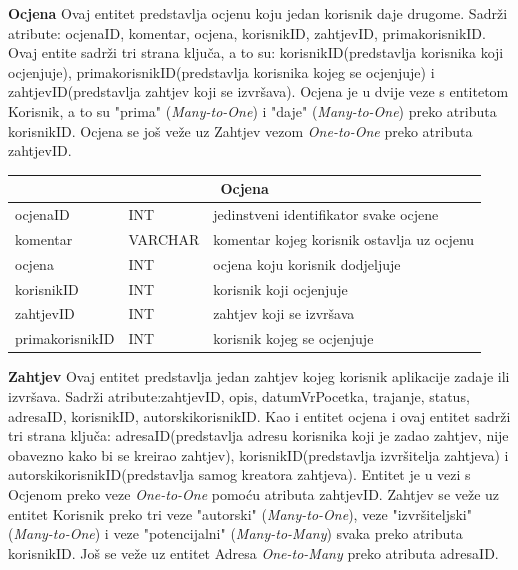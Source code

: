 			\bigskip
			\bigskip
			\textbf{Ocjena} Ovaj entitet predstavlja ocjenu koju jedan korisnik daje drugome. Sadrži atribute: ocjenaID, komentar, ocjena, korisnikID, zahtjevID, primakorisnikID. Ovaj entite sadrži tri strana ključa, a to su: korisnikID(predstavlja korisnika koji ocjenjuje), primakorisnikID(predstavlja korisnika kojeg se ocjenjuje) i zahtjevID(predstavlja zahtjev koji se izvršava). Ocjena je u  dvije veze s entitetom Korisnik, a to su "prima" (\textit{Many-to-One}) i "daje" (\textit{Many-to-One}) preko atributa korisnikID. Ocjena se još veže uz Zahtjev vezom \textit{One-to-One} preko atributa zahtjevID. 
			\bigskip
			
			\begin{tabularx} {\textwidth} {|p{3.5cm}|p{2cm}|X|}
				
				\hline
				\multicolumn{3}{|c|}{\textbf{Ocjena}} \\
				\hline
				
				\cellcolor{LightGreen}ocjenaID & INT	& jedinstveni identifikator svake ocjene	\\ \hline
				komentar	& VARCHAR &  komentar kojeg korisnik ostavlja uz ocjenu 	\\ \hline 
				ocjena & INT & ocjena koju korisnik dodjeljuje  \\ \hline 
				\cellcolor{LightBlue} korisnikID	& INT &  korisnik koji ocjenjuje 	\\ \hline 
				\cellcolor{LightBlue} zahtjevID	& INT &  zahtjev koji se izvršava 	\\ \hline 
				\cellcolor{LightBlue} primakorisnikID	& INT &  korisnik kojeg se ocjenjuje 	\\ \hline 
				
			\end{tabularx}
			
			\bigskip
			\bigskip
			\textbf{Zahtjev} Ovaj entitet predstavlja jedan zahtjev kojeg korisnik aplikacije zadaje ili izvršava. Sadrži atribute:zahtjevID, opis, datumVrPocetka, trajanje, status, adresaID, korisnikID, autorskikorisnikID. Kao i entitet ocjena i ovaj entitet sadrži tri strana ključa: adresaID(predstavlja adresu korisnika koji je zadao zahtjev, nije obavezno kako bi se kreirao zahtjev), korisnikID(predstavlja izvršitelja zahtjeva) i autorskikorisnikID(predstavlja samog kreatora zahtjeva). Entitet je u vezi s Ocjenom preko veze \textit{One-to-One} pomoću atributa zahtjevID. Zahtjev se veže uz entitet Korisnik preko tri veze "autorski" (\textit{Many-to-One}), veze "izvršiteljski" (\textit{Many-to-One}) i veze "potencijalni" (\textit{Many-to-Many}) svaka preko atributa korisnikID. Još se veže uz entitet Adresa \textit{One-to-Many} preko atributa adresaID. 
			\bigskip
			
